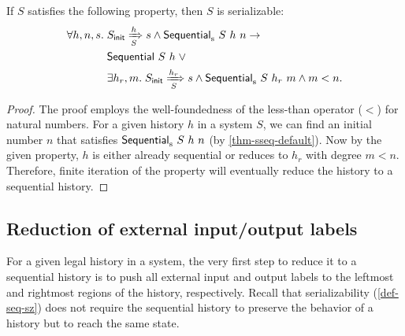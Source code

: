 \begin{theorem}
  \label{thm-sseq-sz}
  If $S$ satisfies the following property, then $S$ is serializable:
  \begin{align*}
    \forall h, n, s.\; & S_{\textsf{init}} \xRightarrow[S]{h} s \land \mathsf{Sequential}_{\textrm{s}}\ S\ h\ n \to \\
    & \mathsf{Sequential}\ S\ h\; \vee\\
    & \exists h_r, m.\; S_{\textsf{init}} \xRightarrow[S]{h_r} s \wedge \mathsf{Sequential}_{\textrm{s}}\ S\ h_r\ m \wedge m < n.
  \end{align*}
\end{theorem}
\begin{proof}
  The proof employs the well-foundedness of the less-than operator ($<$) for natural numbers.
  For a given history $h$ in a system $S$, we can find an initial number $n$ that satisfies $\mathsf{Sequential}_{\textrm{s}}\ S\ h\ n$ (by \autoref{thm-sseq-default}).
  Now by the given property, $h$ is either already sequential or reduces to $h_r$ with degree $m < n$.
  Therefore, finite iteration of the property will eventually reduce the history to a sequential history.
\end{proof}

\subsection{Reduction of external input/output labels}
\label{sec-red-ext-labels}

For a given legal history in a system, the very first step to reduce it to a sequential history is to push all external input and output labels to the leftmost and rightmost regions of the history, respectively.
Recall that serializability (\autoref{def-seq-sz}) does not require the sequential history to preserve the behavior of a history but to reach the same state.

